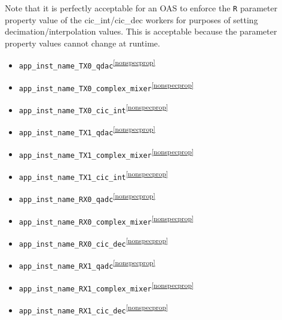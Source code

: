 \documentclass{article}
\begin{document}
  \begin{center}
  \end{center}

  \noindent
  Note that it is perfectly acceptable for an OAS to enforce the \verb+R+
  parameter
  property value of the cic\_int/cic\_dec workers for purposes of setting
  decimation/interpolation values. This is acceptable because the parameter
  property values cannot change at runtime.
  \begin{itemize}
    \item \verb+app_inst_name_TX0_qdac+\textsuperscript{\ref{nonspecprop}}
    \item \verb+app_inst_name_TX0_complex_mixer+\textsuperscript{\ref{nonspecprop}}
    \item \verb+app_inst_name_TX0_cic_int+\textsuperscript{\ref{nonspecprop}}
    \item \verb+app_inst_name_TX1_qdac+\textsuperscript{\ref{nonspecprop}}
    \item \verb+app_inst_name_TX1_complex_mixer+\textsuperscript{\ref{nonspecprop}}
    \item \verb+app_inst_name_TX1_cic_int+\textsuperscript{\ref{nonspecprop}}
    \item \verb+app_inst_name_RX0_qadc+\textsuperscript{\ref{nonspecprop}}
    \item \verb+app_inst_name_RX0_complex_mixer+\textsuperscript{\ref{nonspecprop}}
    \item \verb+app_inst_name_RX0_cic_dec+\textsuperscript{\ref{nonspecprop}}
    \item \verb+app_inst_name_RX1_qadc+\textsuperscript{\ref{nonspecprop}}
    \item \verb+app_inst_name_RX1_complex_mixer+\textsuperscript{\ref{nonspecprop}}
    \item \verb+app_inst_name_RX1_cic_dec+\textsuperscript{\ref{nonspecprop}}
  \end{itemize}
\end{document}
